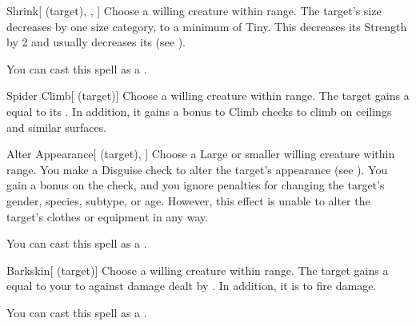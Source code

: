 \lowercase{\hypertarget{spell:Shrink}{}}\label{spell:Shrink}
\begin{attuneability}[\nth{1}]{\hypertarget{spell:Shrink}{Shrink}}[ (target), , ]
Choose a willing creature within \rngclose range.
The target's size decreases by one size category, to a minimum of Tiny.
This decreases its Strength by 2 and usually decreases its  (see ).

You can cast this spell as a .
\end{attuneability}
\vspace{0.25em}



\lowercase{\hypertarget{spell:Spider Climb}{}}\label{spell:Spider Climb}
\begin{attuneability}[\nth{1}]{\hypertarget{spell:Spider Climb}{Spider Climb}}[ (target)]
Choose a willing creature within \rngclose range.
The target gains a  equal to its .
In addition, it gains a  bonus to Climb checks to climb on ceilings and similar surfaces.
\end{attuneability}
\vspace{0.25em}



\lowercase{\hypertarget{spell:Alter Appearance}{}}\label{spell:Alter Appearance}
\begin{attuneability}[\nth{2}]{\hypertarget{spell:Alter Appearance}{Alter Appearance}}[ (target), ]
Choose a Large or smaller willing creature within \rngclose range.
You make a Disguise check to alter the target's appearance (see ).
You gain a  bonus on the check, and you ignore penalties for changing the target's gender, species, subtype, or age.
However, this effect is unable to alter the target's clothes or equipment in any way.

You can cast this spell as a .
\end{attuneability}
\vspace{0.25em}



\lowercase{\hypertarget{spell:Barkskin}{}}\label{spell:Barkskin}
\begin{attuneability}[\nth{2}]{\hypertarget{spell:Barkskin}{Barkskin}}[ (target)]
Choose a willing creature within \rngclose range.
The target gains a  equal to your  to  against damage dealt by .
In addition, it is  to fire damage.

You can cast this spell as a .
\end{attuneability}
\vspace{0.25em}



